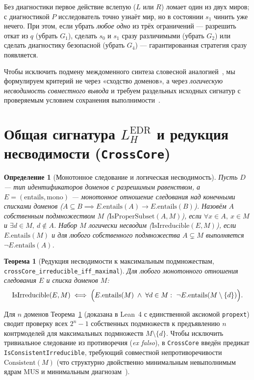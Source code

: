 \documentclass[10pt,a4paper]{article}
\theoremstyle{cleanthm}
\newtheorem{theorem}{Теорема}[section]
\theoremstyle{cleandef}
\newtheorem{definition}{Определение}[section]
\begin{document}
Без диагностики первое действие вслепую ($L$ или $R$) ломает один из двух миров; с диагностикой $P$ исследователь точно узнаёт мир, но в состоянии $s_1$ чинить уже нечего. При этом, если убрать \emph{любое одно} из трёх ограничений — разрешить откат из $q$ (убрать $G_1$), сделать $s_0$ и $s_1$ сразу различимыми (убрать $G_2$) или сделать диагностику безопасной (убрать $G_4$) — гарантированная стратегия сразу появляется.

Чтобы исключить подмену междоменного синтеза словесной аналогией~\cite{gentner1983}, мы формулируем критерий не через «сходство доменов», а через \emph{логическую несводимость совместного вывода} и требуем раздельных исходных сигнатур с проверяемым условием сохранения выполнимости~\cite{goguen1992}.

\section{Общая сигнатура \texorpdfstring{$L_H^{\mathrm{EDR}}$}{L\_H\^{}EDR} и редукция несводимости (\texorpdfstring{\texttt{CrossCore}}{CrossCore})}

\begin{definition}[Монотонное следование и логическая несводимость]
Пусть $D$ — тип идентификаторов доменов с разрешимым равенством, а $E = (\mathrm{entails}, \mathrm{mono})$ — монотонное отношение следования над конечными списками доменов ($A\subseteq B \implies E.\mathrm{entails}(A)\to E.\mathrm{entails}(B)$). Назовём $A$ собственным подмножеством $M$ ($\mathrm{IsProperSubset}(A,M)$), если $\forall x\in A,\ x\in M$ и $\exists d\in M,\ d\notin A$. Набор $M$ \emph{логически несводим} ($\mathrm{IsIrreducible}(E,M)$), если $E.\mathrm{entails}(M)$ и для любого собственного подмножества $A\subsetneq M$ выполняется $\neg E.\mathrm{entails}(A)$.
\end{definition}

\begin{theorem}[Редукция несводимости к максимальным подмножествам, \texttt{crossCore\_\allowbreak irreducible\_\allowbreak iff\_\allowbreak maximal}]
\label{thm:crosscore}
Для любого монотонного отношения следования $E$ и списка доменов $M$:
\begin{equation}
  \mathrm{IsIrreducible}(E,M) \iff \Bigl(E.\mathrm{entails}(M) \;\land\; \forall d\in M:\ \neg E.\mathrm{entails}(M\setminus\{d\})\Bigr).
\end{equation}
\end{theorem}

Для $n$ доменов Теорема~\ref{thm:crosscore} (доказана в Lean~4 с единственной аксиомой \texttt{propext}) сводит проверку всех $2^n-1$ собственных подмножеств к предъявлению $n$ контрмоделей для максимальных подмножеств $M\setminus\{d\}$. Чтобы исключить тривиальное следование из противоречия (\emph{ex falso}), в \texttt{CrossCore} введён предикат \texttt{IsConsistentIrreducible}, требующий совместной непротиворечивости $\mathrm{Consistent}(M)$ (что структурно двойственно минимальным невыполнимым ядрам MUS и минимальным диагнозам~\cite{reiter1987}).
\end{document}
